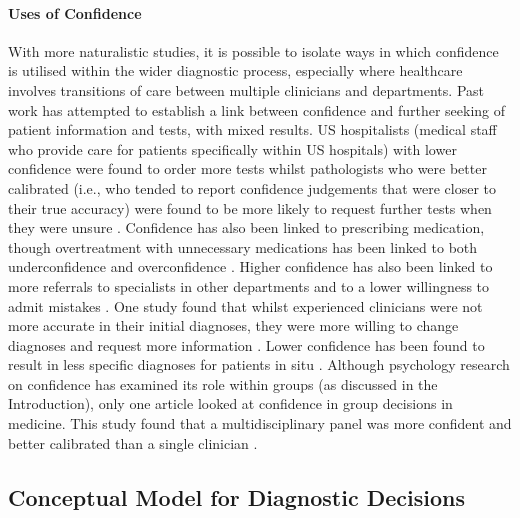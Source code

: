 \documentclass[a4paper, nobind]{templates/ociamthesis}
\begin{document}
\paragraph{Uses of Confidence}\label{uses-of-confidence}

With more naturalistic studies, it is possible to isolate ways in which confidence is utilised within the wider diagnostic process, especially where healthcare involves transitions of care between multiple clinicians and departments. Past work has attempted to establish a link between confidence and further seeking of patient information and tests, with mixed results. US hospitalists (medical staff who provide care for patients specifically within US hospitals) with lower confidence were found to order more tests \autocite{gupta_associations_2023} whilst pathologists who were better calibrated (i.e., who tended to report confidence judgements that were closer to their true accuracy) were found to be more likely to request further tests when they were unsure \autocite{clayton_are_2023}. Confidence has also been linked to prescribing medication, though overtreatment with unnecessary medications has been linked to both underconfidence \autocite{levin_antimicrobial_2012} and overconfidence \autocite{garbayo_metacognitive_2023}. Higher confidence has also been linked to more referrals to specialists in other departments \autocite{calman_variability_1992} and to a lower willingness to admit mistakes \autocite{brezis_does_2019}. One study found that whilst experienced clinicians were not more accurate in their initial diagnoses, they were more willing to change diagnoses and request more information \autocite{krupat_avoiding_2017}. Lower confidence has been found to result in less specific diagnoses for patients in situ \autocite{hageman_surgeon_2013}. Although psychology research on confidence has examined its role within groups (as discussed in the Introduction), only one article looked at confidence in group decisions in medicine. This study found that a multidisciplinary panel was more confident and better calibrated than a single clinician \autocite{thorlacius-ussing_comparing_2021}.

\subsection{Conceptual Model for Diagnostic Decisions}\label{conceptual-model-for-diagnostic-decisions}
\end{document}
